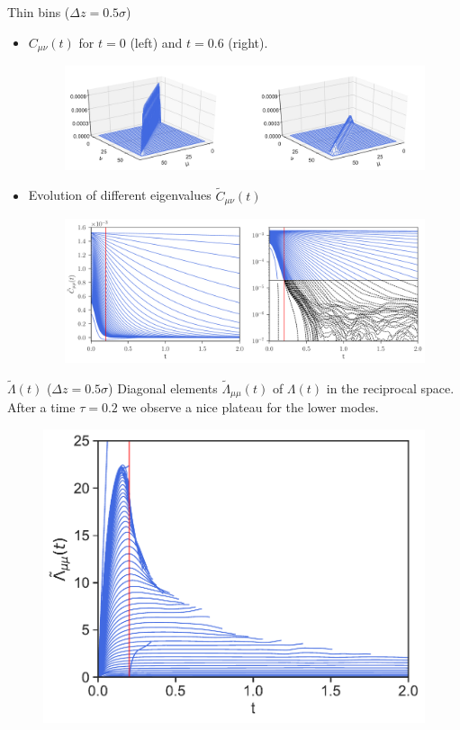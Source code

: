 \documentclass{beamer}
\begin{document}
\begin{frame}{Thin bins ($\Delta z=0.5\sigma$)}
  \begin{itemize}
    \item $C_{\mu\nu}(t)$ for  $t=0$ (left) and $t=0.6$ (right).
\begin{figure}[h!]
\includegraphics[width=\linewidth]{Ct-matrix-WALLS-66nodes}
\end{figure}
\item Evolution of different eigenvalues $\tilde{C}_{\mu\nu}(t)$
\begin{figure}[h!]
  \includegraphics[width=\linewidth]{CtRec-WALLS-66nodes-exp}
\end{figure}
\end{itemize}
\end{frame}

\begin{frame}{$\tilde{\Lambda}(t)$ ($\Delta z=0.5\sigma$)}
Diagonal elements  $\tilde{\Lambda}_{\mu\mu}(t)$ of $\Lambda(t)$ in the reciprocal space. After a time $\tau=0.2$ we observe a nice plateau for the lower modes. 
\begin{figure}[h!]
\includegraphics[width=0.5\linewidth]{LambdatRec-WALLS-66nodes}
\end{figure}
\end{frame}
\end{document}
